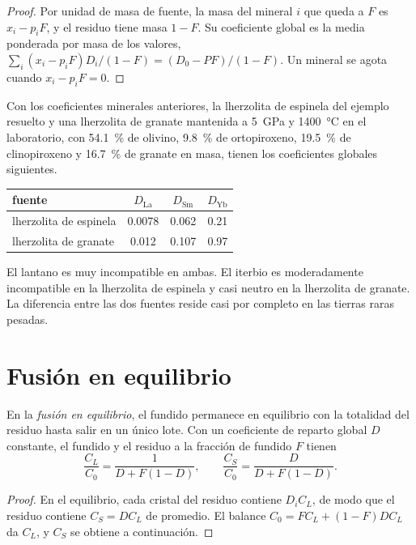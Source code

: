 \begin{proof}
Por unidad de masa de fuente, la masa del mineral $i$ que queda a $F$ es $x_i - p_iF$,
y el residuo tiene masa $1 - F$. Su coeficiente global es la media ponderada por masa
de los valores, $\sum_i (x_i - p_iF)D_i/(1 - F) = (D_0 - PF)/(1 - F)$. Un mineral se agota
cuando $x_i - p_iF = 0$.
\end{proof}

Con los coeficientes minerales anteriores, la lherzolita de espinela del ejemplo
resuelto y una lherzolita de granate mantenida a \qty{5}{GPa} y
\qty{1400}{\celsius} en el laboratorio, con \qty{54.1}{\percent} de olivino,
\qty{9.8}{\percent} de ortopiroxeno, \qty{19.5}{\percent} de clinopiroxeno y
\qty{16.7}{\percent} de granate en masa, tienen los coeficientes globales siguientes.
\begin{center}
\small
\begin{tabular}{lccc}
\hline
fuente & $D_{\mathrm{La}}$ & $D_{\mathrm{Sm}}$ & $D_{\mathrm{Yb}}$ \\
\hline
lherzolita de espinela & 0.0078 & 0.062 & 0.21 \\
lherzolita de granate & 0.012 & 0.107 & 0.97 \\
\hline
\end{tabular}
\end{center}
El lantano es muy incompatible en ambas. El iterbio es moderadamente incompatible
en la lherzolita de espinela y casi neutro en la lherzolita de granate. La
diferencia entre las dos fuentes reside casi por completo en las tierras raras
pesadas.

\section{Fusión en equilibrio}\label{sec:b3:trace-element-modelling:batch}

\begin{theorem}\label{thm:b3:trace-element-modelling:batch}
En la \emph{fusión en equilibrio}, el fundido permanece en equilibrio
con la totalidad del residuo hasta salir en un único lote. Con un coeficiente de reparto global
$D$ constante, el fundido y el residuo a la fracción de fundido $F$
tienen
\[
\frac{C_L}{C_0} = \frac{1}{D + F(1 - D)}, \qquad
\frac{C_S}{C_0} = \frac{D}{D + F(1 - D)}.
\]
\end{theorem}

\begin{proof}
En el equilibrio, cada cristal del residuo contiene $D_iC_L$, de modo que el residuo
contiene $C_S = DC_L$ de promedio. El balance $C_0 = FC_L + (1 - F)DC_L$ da
$C_L$, y $C_S$ se obtiene a continuación.
\end{proof}

